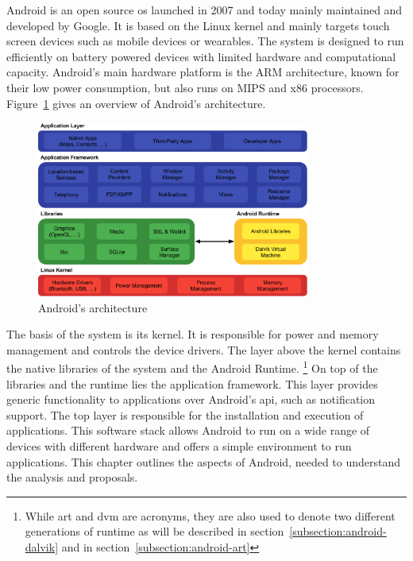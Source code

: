 Android is an open source \gls{os} launched in 2007 and today mainly maintained and developed by Google.
It is based on the Linux kernel and mainly targets touch screen devices such as mobile devices or wearables.
The system is designed to run efficiently on battery powered devices with limited hardware and computational capacity.
Android's main hardware platform is the ARM architecture, known for their low power consumption, but also runs on MIPS and x86 processors.
\newline
\newline
Figure~\ref{fig:androidArchitecture} gives an overview of Android's architecture.
\begin{figure}[h]
    \centering
    \includegraphics[width=0.8\textwidth]{data/stack.png}
    \caption{Android's architecture \cite{googleDalvik}}
    \label{fig:androidArchitecture}
\end{figure}
\newline
The basis of the system is its kernel.
It is responsible for power and memory management and controls the device drivers.
\newline
The layer above the kernel contains the native libraries of the system and the Android Runtime.
\footnote[1]{While \gls{art} and \gls{dvm} are acronyms, they are also used to denote two different generations of runtime as will be described in section~\ref{subsection:android-dalvik} and in section~\ref{subsection:android-art}}
\newline
On top of the libraries and the runtime lies the application framework.
This layer provides generic functionality to applications over Android's \gls{api}, such as notification support.
\newline
The top layer is responsible for the installation and execution of applications.
\newline
This software stack allows Android to run on a wide range of devices with different hardware and offers a simple environment to run applications.
\newline
\newline
This chapter outlines the aspects of Android, needed to understand the analysis and proposals.
